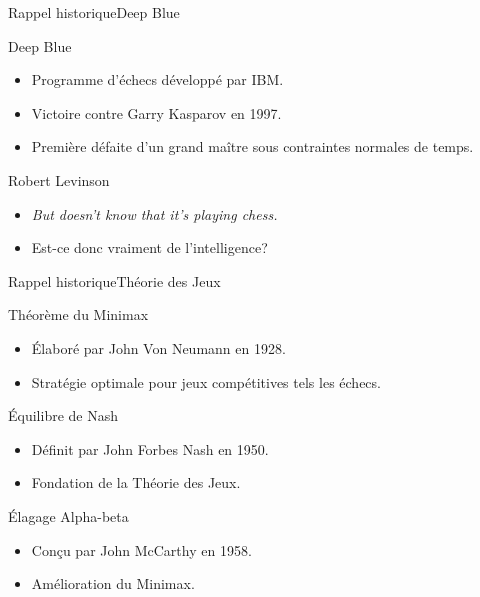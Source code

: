 
\begin{frame}{Rappel historique}{Deep Blue}

\begin{block}{Deep Blue} 
\begin{itemize}
\item Programme d'échecs développé par IBM.
\item Victoire contre Garry Kasparov en 1997.
\item Première défaite d'un grand maître sous contraintes normales de temps.
\end{itemize}
\end{block}

\pause

\begin{block}{Robert Levinson} 
\begin{itemize}
\item \textit{\og But doesn't know that it's playing chess.\fg{}}
\item Est-ce donc vraiment de l'intelligence?
\end{itemize}
\end{block}

\end{frame}




\begin{frame}{Rappel historique}{Théorie des Jeux}
 
\begin{block}{Théorème du Minimax} 
\begin{itemize}
\item Élaboré par John Von Neumann en 1928.
\item Stratégie optimale pour jeux compétitives tels les échecs.
\end{itemize}
\end{block}

\pause

\begin{block}{Équilibre de Nash} 
\begin{itemize}
\item Définit par John Forbes Nash en 1950.
\item Fondation de la Théorie des Jeux.
\end{itemize}
\end{block}

\pause

\begin{block}{Élagage Alpha-beta} 
\begin{itemize}
\item Conçu par John McCarthy en 1958.
\item Amélioration du Minimax.
\end{itemize}
\end{block}

\end{frame}


